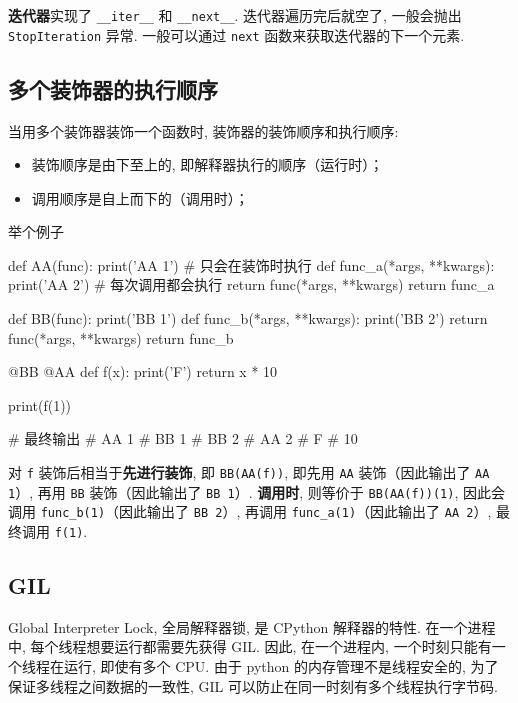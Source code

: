 \textbf{迭代器}实现了 \texttt{__iter__} 和 \texttt{__next__}. 迭代器遍历完后就空了, 一般会抛出 \texttt{StopIteration} 异常. 一般可以通过 \texttt{next} 函数来获取迭代器的下一个元素. 

\subsection{多个装饰器的执行顺序}
当用多个装饰器装饰一个函数时, 装饰器的装饰顺序和执行顺序: 
\begin{itemize}
	\item 装饰顺序是由下至上的, 即解释器执行的顺序（运行时）；
	
	\item 调用顺序是自上而下的（调用时）；
\end{itemize}
举个例子
\begin{python}
	def AA(func):
		print('AA 1')  # 只会在装饰时执行
		def func_a(*args, **kwargs):
			print('AA 2')  # 每次调用都会执行
			return func(*args, **kwargs)
		return func_a
	
	def BB(func):
		print('BB 1')
		def func_b(*args, **kwargs):
			print('BB 2')
			return func(*args, **kwargs)
		return func_b
	
	@BB
	@AA
	def f(x):
		print('F')
		return x * 10
	
	print(f(1))
	
	# 最终输出
 	# AA 1
	# BB 1
	# BB 2
	# AA 2
	# F
	# 10
\end{python}

对 \texttt{f} 装饰后相当于\textbf{先进行装饰}, 即 \texttt{BB(AA(f))}, 即先用 \texttt{AA} 装饰（因此输出了 \texttt{AA 1}）, 再用 \texttt{BB} 装饰（因此输出了 \texttt{BB 1}）. \textbf{调用时}, 则等价于 \texttt{BB(AA(f))(1)}, 因此会调用 \texttt{func_b(1)}（因此输出了 \texttt{BB 2}）, 再调用 \texttt{func_a(1)}（因此输出了 \texttt{AA 2}）, 最终调用 \texttt{f(1)}. 


\subsection{GIL}
Global Interpreter Lock, 全局解释器锁, 是 CPython 解释器的特性. 在一个进程中, 每个线程想要运行都需要先获得 GIL. 因此, 在一个进程内, 一个时刻只能有一个线程在运行, 即使有多个 CPU. 由于 python 的内存管理不是线程安全的, 为了保证多线程之间数据的一致性, GIL 可以防止在同一时刻有多个线程执行字节码. 

